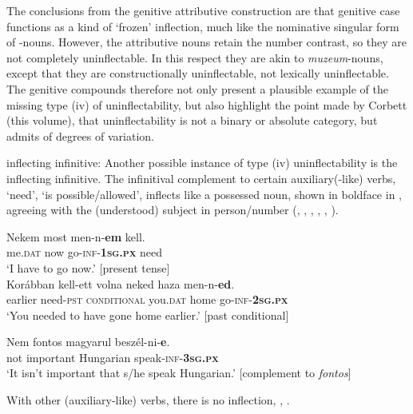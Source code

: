 \documentclass[output=paper,colorlinks,citecolor=brown]{langscibook}
\begin{document}
The conclusions from the  genitive attributive construction are that genitive case functions as a kind of `frozen' inflection, much like the nominative singular form of  -nouns. However, the attributive nouns retain the number contrast, so they are not completely uninflectable. In this respect they are akin to  \emph{muzeum}-nouns, except that they are  constructionally uninflectable, not lexically uninflectable. The  genitive compounds therefore not only present a plausible example of the missing type (iv)  of uninflectability, but also highlight the point made by Corbett (this volume), that uninflectability is not a binary or absolute category, but admits of degrees of variation. 

 inflecting infinitive: Another  possible instance of  type (iv) uninflectability is the  inflecting infinitive. The infinitival complement to certain auxiliary(-like) verbs,  `need',  `is possible/allowed',  inflects like a possessed noun, shown in boldface in , agreeing with the (understood) subject in person/number (, \citealp[314]{keneseivagofenyvesi1998}, , \citealp[210]{kiss2002}, , \citealt[318]{keneseivagofenyvesi1998}).

\ea\label{hunginf}
\begin{xlist}
	\ex \label{mennem}
	
	
	\gll	Nekem		most		{men-n-\textbf{em}}		kell.		\\
	me.\textsc{dat}	now		go-\textsc{inf-\textbf{1sg.px}}	need		\\
	\glt		`I have to go now.'		\hfill{[present tense] }\\
	
	\ex	\label{menned}
	\gll	Korábban	kell-ett			volna 			neked		haza 	{men-n-\textbf{ed}}.			\\
	earlier	need-\textsc{pst}	\textsc{conditional} 	you.\textsc{dat} home	go-\textsc{inf-\textbf{2sg.px}}		\\
	\glt		`You needed to have gone home earlier.'	\hfill{[past conditional]}	
	\ex \label{beszelnie}
	
	\gll	Nem	fontos	magyarul	{beszél-ni-\textbf{e}}.		\\
	not	important	Hungarian	speak-\textsc{inf-\textbf{3sg.px}}		\\
	\glt		`It isn't important that s/he speak Hungarian.'	\hfill{[complement to \emph{fontos}]}	\\
\end{xlist}
\z
With other (auxiliary-like) verbs, there is no inflection, , \citep[314]{keneseivagofenyvesi1998}.
\end{document}
